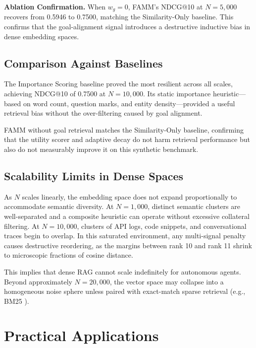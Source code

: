 \documentclass[conference]{IEEEtran}
\begin{document}
\textbf{Ablation Confirmation.} When $w_g{=}0$, FAMM's NDCG@10 at $N{=}5{,}000$ recovers from 0.5946 to 0.7500, matching the Similarity-Only baseline. This confirms that the goal-alignment signal introduces a destructive inductive bias in dense embedding spaces.

\subsection{Comparison Against Baselines}
The Importance Scoring baseline proved the most resilient across all scales, achieving NDCG@10 of 0.7500 at $N{=}10{,}000$. Its static importance heuristic---based on word count, question marks, and entity density---provided a useful retrieval bias without the over-filtering caused by goal alignment.

FAMM without goal retrieval matches the Similarity-Only baseline, confirming that the utility scorer and adaptive decay do not harm retrieval performance but also do not measurably improve it on this synthetic benchmark.

\subsection{Scalability Limits in Dense Spaces}
As $N$ scales linearly, the embedding space does not expand proportionally to accommodate semantic diversity. At $N{=}1{,}000$, distinct semantic clusters are well-separated and a composite heuristic can operate without excessive collateral filtering. At $N{=}10{,}000$, clusters of API logs, code snippets, and conversational traces begin to overlap. In this saturated environment, any multi-signal penalty causes destructive reordering, as the margins between rank 10 and rank 11 shrink to microscopic fractions of cosine distance.

This implies that dense RAG cannot scale indefinitely for autonomous agents. Beyond approximately $N{=}20{,}000$, the vector space may collapse into a homogeneous noise sphere unless paired with exact-match sparse retrieval (e.g., BM25 \cite{robertson2009bm25}).

\section{Practical Applications}
\label{sec:applications}
\end{document}
